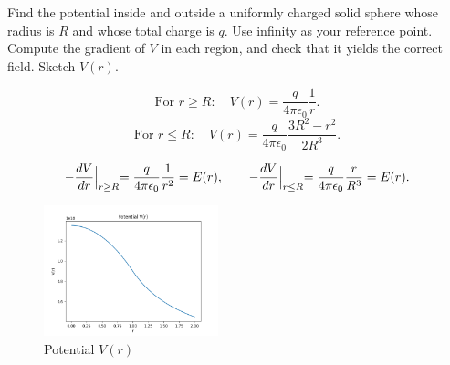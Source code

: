\begin{hwkProblem}{2.21}{}

	Find the potential inside and outside a uniformly charged solid sphere whose radius is \( R \) and whose total charge is \( q \). Use infinity as your reference point. Compute the gradient of \( V \) in each region, and check that it yields the correct field. Sketch \( V(r) \).

	\hwkSol

	\hwkPart
	\[
	\text{For } r\ge R:\quad V(r)=\frac{q}{4\pi\epsilon_0}\frac{1}{r}.
	\]
	\[
	\text{For } r\le R:\quad V(r)=\frac{q}{4\pi\epsilon_0}\frac{3R^2-r^2}{2R^3}.
	\]
	\hwkPart

	\[
	-\frac{dV}{dr}\Bigl|_{r\ge R}=\frac{q}{4\pi\epsilon_0}\frac{1}{r^2}=E(r),\qquad
	-\frac{dV}{dr}\Bigl|_{r\le R}=\frac{q}{4\pi\epsilon_0}\frac{r}{R^3}=E(r).
	\]

	\hwkPart
	
	\begin{figure}[ht]
		\begin{center}
			\includegraphics[width=0.45\textwidth]{./images/s2_21.png}
		\end{center}
		\caption{Potential \( V(r) \)}\label{fig:s2_21}
	\end{figure}

\end{hwkProblem}

